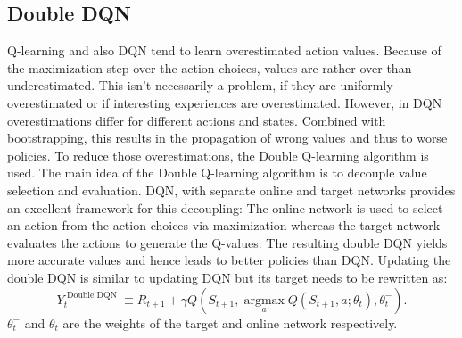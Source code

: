 \documentclass[12pt]{article}
\begin{document}
\subsection{Double DQN}
Q-learning  and also DQN tend to learn overestimated action values. Because of the maximization step over the action choices, values are rather over than underestimated.
This isn't necessarily a problem, if they are uniformly overestimated or if interesting experiences are overestimated. However, in DQN overestimations differ for different actions and states. Combined with bootstrapping, this results in the propagation of wrong values and thus to worse policies. To reduce those overestimations, the Double Q-learning algorithm is used. 
The main idea of the Double Q-learning algorithm is to decouple value selection and evaluation.
DQN, with separate online and target networks provides an excellent framework for this decoupling:
The online network is used to select an action from the action choices via maximization whereas the target network evaluates the actions to generate the Q-values.
The resulting double DQN yields more accurate values and hence leads to better policies than DQN.
Updating the double DQN is similar to updating DQN but its target needs to be rewritten as:
\begin{equation}
Y_{t}^{\text { Double DQN }} \equiv R_{t+1}+\gamma Q\left(S_{t+1}, \underset{a}{\operatorname{argmax}} Q\left(S_{t+1}, a ; \theta_{t}\right), \theta_{t}^{-}\right).
\end{equation}
$\theta_{t}^{-}$ and $\theta_{t}$ are the weights of the target and online network respectively.
\cite{DBLP:journals/corr/HasseltGS15}
\end{document}

